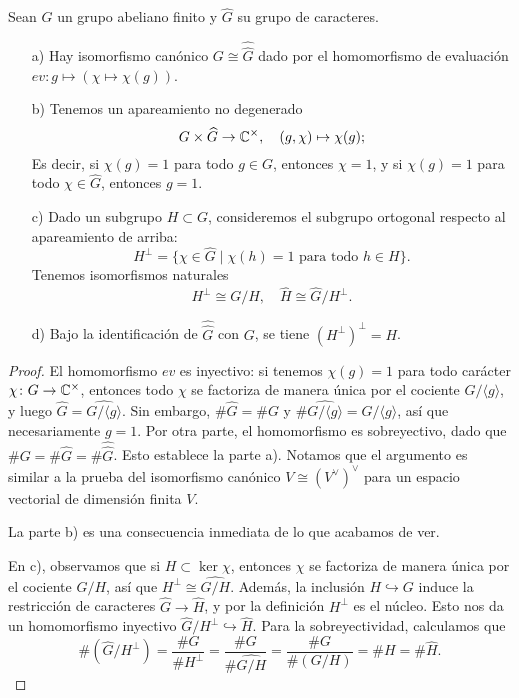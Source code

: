 \begin{proposicion}
  Sean $G$ un grupo abeliano finito y $\widehat{G}$ su grupo de caracteres.

  \begin{enumerate}
  \item[a)] Hay isomorfismo canónico $G \cong \widehat{\widehat{G}}$
    dado por el homomorfismo de evaluación
    $ev\colon g \mapsto (\chi \mapsto \chi (g))$.

  \item[b)] Tenemos un apareamiento no degenerado
    \[ G\times \widehat{G} \to \mathbb{C}^\times, \quad
       (g,\chi) \mapsto \chi (g); \]
    Es decir, si $\chi (g) = 1$ para todo $g \in G$, entonces $\chi = 1$,
    y si $\chi (g) = 1$ para todo $\chi \in \widehat{G}$, entonces $g = 1$.

  \item[c)] Dado un subgrupo $H \subset G$, consideremos el subgrupo ortogonal
    respecto al apareamiento de arriba:
    $$H^\perp = \{ \chi \in \widehat{G} \mid \chi (h) = 1 \text{ para todo } h\in H \}.$$
    Tenemos isomorfismos naturales
    \[ H^\perp \cong \widehat{G/H}, \quad \widehat{H} \cong \widehat{G}/H^\perp. \]

  \item[d)] Bajo la identificación de $\widehat{\widehat{G}}$ con $G$, se tiene
    $(H^\perp)^\perp = H$.
  \end{enumerate}

  \begin{proof}
    El homomorfismo $ev$ es inyectivo: si tenemos $\chi (g) = 1$ para todo
    carácter $\chi\colon G \to \mathbb{C}^\times$, entonces todo $\chi$ se factoriza de
    manera única por el cociente $G/\langle g\rangle$, y luego
    $\widehat{G} = \widehat{G/\langle g\rangle}$. Sin embargo,
    $\#\widehat{G} = \# G$ y $\#\widehat{G/\langle g\rangle} = G/\langle g\rangle$,
    así que necesariamente $g = 1$.  Por otra parte, el homomorfismo es
    sobreyectivo, dado que
    $\# G = \# \widehat{G} = \# \widehat{\widehat{G}}$.
    Esto establece la parte a). Notamos que el argumento es similar a la prueba
    del isomorfismo canónico $V \cong (V^\vee)^\vee$ para un espacio vectorial
    de dimensión finita $V$.

    La parte b) es una consecuencia inmediata de lo que acabamos de ver.

    En c), observamos que si $H \subset \ker \chi$, entonces $\chi$ se factoriza
    de manera única por el cociente $G/H$, así que $H^\perp \cong \widehat{G/H}$.
    Además, la inclusión $H \hookrightarrow G$ induce la restricción de
    caracteres $\widehat{G} \to \widehat{H}$, y por la definición
    $H^\perp$ es el núcleo. Esto nos da un homomorfismo inyectivo
    $\widehat{G}/H^\perp \hookrightarrow \widehat{H}$. Para la sobreyectividad,
    calculamos que
    \[ \# (\widehat{G}/H^\perp) = \frac{\# G}{\# H^\perp} =
    \frac{\# G}{\# \widehat{G/H}} = \frac{\# G}{\# (G/H)} =
    \# H = \# \widehat{H}. \]


\end{proof}
\end{proposicion}
